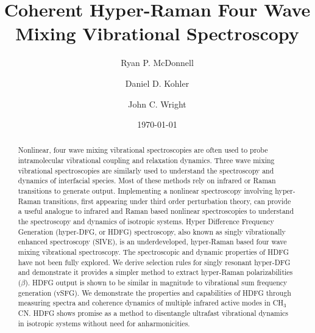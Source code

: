 \documentclass[aip, jcp, reprint, onecolumn]{revtex4-2}
\begin{document}
\title{Coherent Hyper-Raman Four Wave Mixing Vibrational Spectroscopy}


\author{Ryan P. McDonnell} 
\author{Daniel D. Kohler}
\author{John C. Wright} 


\date{\today}

\begin{abstract}
Nonlinear, four wave mixing vibrational spectroscopies are often used to probe intramolecular vibrational coupling and relaxation dynamics.
Three wave mixing vibrational spectroscopies are similarly used to understand the spectroscopy and dynamics of interfacial species.
Most of these methods rely on infrared or Raman transitions to generate output. 
Implementing a nonlinear spectroscopy involving hyper-Raman transitions, first appearing under third order perturbation theory, can provide a useful analogue to infrared and Raman based nonlinear spectroscopies to understand the spectroscopy and dynamics of isotropic systems.
Hyper Difference Frequency Generation (hyper-DFG, or HDFG) spectroscopy, also known as singly vibrationally enhanced spectroscopy (SIVE), is an underdeveloped, hyper-Raman based four wave mixing vibrational spectroscopy. 
The spectroscopic and dynamic properties of HDFG have not been fully explored.
We derive selection rules for singly resonant hyper-DFG and demonstrate it provides a simpler method to extract hyper-Raman polarizabilities ($\beta$).
HDFG output is shown to be similar in magnitude to vibrational sum frequency generation (vSFG). 
We demonstrate the properties and capabilities of HDFG through measuring spectra and coherence dynamics of multiple infrared active modes in CH$_3$CN.
HDFG shows promise as a method to disentangle ultrafast vibrational dynamics in isotropic systems without need for anharmonicities.

\end{abstract}

\maketitle
\end{document}
